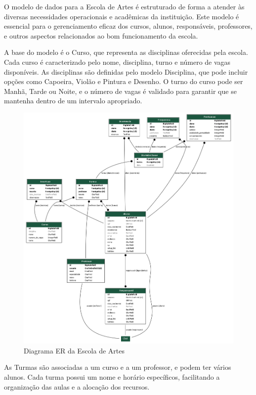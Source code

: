 O modelo de dados para a Escola de Artes é estruturado de forma a atender às diversas necessidades operacionais e acadêmicas da instituição. Este modelo é essencial para o gerenciamento eficaz dos cursos, alunos, responsáveis, professores, e outros aspectos relacionados ao bom funcionamento da escola.

A base do modelo é o Curso, que representa as disciplinas oferecidas pela escola. Cada curso é caracterizado pelo nome, disciplina, turno e número de vagas disponíveis. As disciplinas são definidas pelo modelo Disciplina, que pode incluir opções como Capoeira, Violão e Pintura e Desenho. O turno do curso pode ser Manhã, Tarde ou Noite, e o número de vagas é validado para garantir que se mantenha dentro de um intervalo apropriado.

\begin{figure}[htb]
	\caption{\label{fig_grafico}Diagrama ER da Escola de Artes}
	\begin{center}
	    \includegraphics[scale=0.3]{./img/er_diagram_escola.png}
	\end{center}
\end{figure}

As Turmas são associadas a um curso e a um professor, e podem ter vários alunos. Cada turma possui um nome e horário específicos, facilitando a organização das aulas e a alocação dos recursos.

